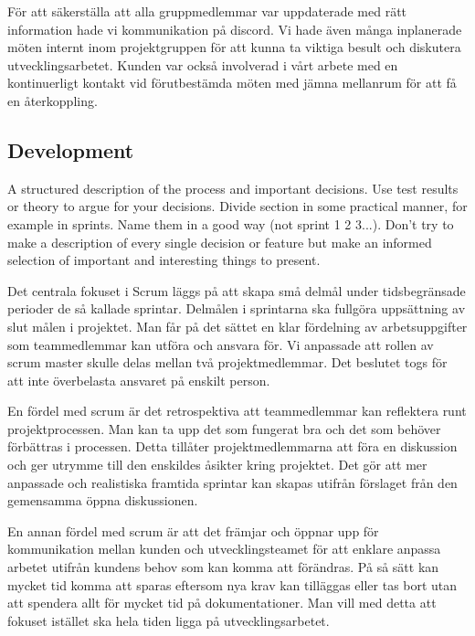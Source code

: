 \documentclass[12pt]{article}
\begin{document}
För att säkerställa att alla gruppmedlemmar var uppdaterade med rätt information hade vi kommunikation på discord. Vi hade även många inplanerade möten internt inom projektgruppen för att kunna ta viktiga besult och diskutera utvecklingsarbetet. Kunden var också involverad i vårt arbete med en kontinuerligt kontakt vid förutbestämda möten med jämna mellanrum för att få en återkoppling.  


\subsection{Development}
A structured description of the process and important decisions. Use test results or theory to argue for your decisions. Divide section in some practical manner, for example in sprints. Name them in a good way (not sprint 1 2 3...). Don’t try to make a description of every single decision or feature but make an informed selection of important and interesting things to present.


Det centrala fokuset i Scrum läggs på att skapa små delmål under tidsbegränsade perioder de så kallade sprintar. Delmålen i sprintarna ska fullgöra uppsättning av slut målen i projektet. Man får på det sättet en klar fördelning av arbetsuppgifter som teammedlemmar kan utföra och ansvara för. Vi anpassade att rollen av scrum master skulle delas mellan två projektmedlemmar. Det beslutet togs för att inte överbelasta ansvaret på enskilt person. 

En fördel med scrum är det retrospektiva att teammedlemmar kan reflektera runt projektprocessen. Man kan ta upp det som fungerat bra och det som behöver förbättras i processen. Detta tillåter projektmedlemmarna att föra en diskussion och ger utrymme till den enskildes åsikter kring projektet. Det gör att mer anpassade och realistiska framtida sprintar kan skapas utifrån förslaget från den gemensamma öppna diskussionen. 

En annan fördel med scrum är att det främjar och öppnar upp för kommunikation mellan kunden och utvecklingsteamet för att enklare anpassa arbetet utifrån kundens behov som kan komma att förändras. På så sätt kan mycket tid komma att sparas eftersom nya krav kan tilläggas eller tas bort utan att spendera allt för mycket tid på dokumentationer. Man vill med detta att fokuset istället ska hela tiden ligga på utvecklingsarbetet. 
\end{document}
